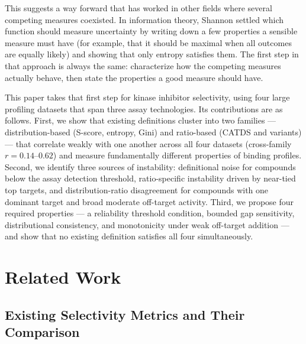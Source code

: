 \documentclass[journal=jcisd8,manuscript=article]{achemso}
\begin{document}
This suggests a way forward that has worked in other fields where several
competing measures coexisted.
In information theory, Shannon\cite{Shannon1948} settled which function should
measure uncertainty by writing down a few properties a sensible measure must
have (for example, that it should be maximal when all outcomes are equally
likely) and showing that only entropy satisfies them.
The first step in that approach is always the same: characterize how the
competing measures actually behave, then state the properties a good measure
should have.

This paper takes that first step for kinase inhibitor selectivity, using four
large profiling datasets that span three assay technologies.
Its contributions are as follows.
First, we show that existing definitions cluster into two families ---
distribution-based (S-score, entropy, Gini) and ratio-based (CATDS and
variants) --- that correlate weakly with one another across all four datasets
(cross-family $r = 0.14$--$0.62$) and measure fundamentally different
properties of binding profiles.
Second, we identify three sources of instability: definitional noise for
compounds below the assay detection threshold, ratio-specific instability
driven by near-tied top targets, and distribution-ratio disagreement for
compounds with one dominant target and broad moderate off-target activity.
Third, we propose four required properties --- a reliability threshold condition,
bounded gap sensitivity, distributional consistency, and monotonicity under
weak off-target addition --- and show that no existing definition satisfies
all four simultaneously.
\section{Related Work}
\label{sec:related}

\subsection{Existing Selectivity Metrics and Their Comparison}
\label{sec:related:metrics}
\end{document}
